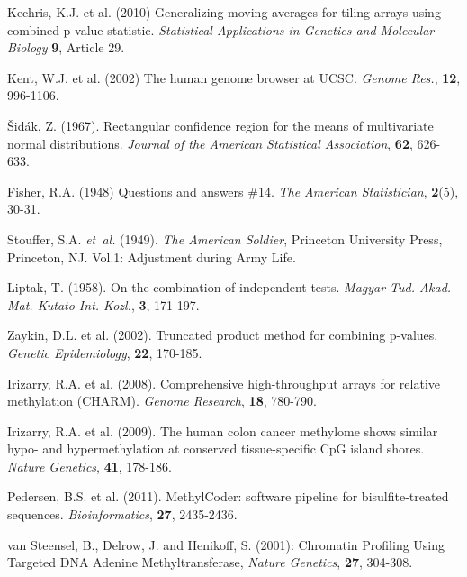 \documentclass{bioinfo}
\begin{document}
\begin{thebibliography}{}

Kechris, K.J. et al. (2010)
Generalizing moving averages for tiling arrays using combined p-value
statistic. {\it Statistical Applications in Genetics and Molecular Biology}
{\bf 9}, Article 29.

 Kent, W.J. et al. (2002) The human genome browser at UCSC. {\it
Genome Res.}, {\bf 12}, 996-1106.

\v{S}id\'{a}k, Z. (1967).
Rectangular confidence region for the means of multivariate normal distributions.
\textit{Journal of the American Statistical Association}, {\bf 62}, 626-633.

Fisher, R.A. (1948)
Questions and answers \#14.
{\it The American Statistician}, {\bf 2}(5), 30-31.

Stouffer, S.A. \textit{et~al.} (1949). \textit{The American Soldier},
Princeton University Press, Princeton, NJ. Vol.1: Adjustment during Army Life.

Liptak, T. (1958). On the combination of independent tests. {\it Magyar Tud.
Akad. Mat. Kutato Int. Kozl.}, {\bf 3}, 171-197.

 Zaykin, D.L. et al. (2002).
Truncated product method for combining p-values. {\it Genetic Epidemiology},
{\bf 22}, 170-185.

 Irizarry, R.A. et al.
(2008). Comprehensive high-throughput arrays for relative methylation (CHARM).
{\it Genome Research}, {\bf 18}, 780-790.

 Irizarry, R.A. et al.
(2009). The human colon cancer methylome shows similar hypo- and
hypermethylation at conserved tissue-specific CpG island shores.
{\it Nature Genetics}, {\bf 41}, 178-186.

 Pedersen, B.S. et al.
(2011). MethylCoder: software pipeline for bisulfite-treated sequences.
{\it Bioinformatics}, {\bf 27}, 2435-2436.

van Steensel, B., Delrow, J. and Henikoff, S. (2001):
Chromatin Profiling Using Targeted DNA Adenine Methyltransferase,
{\it Nature Genetics}, {\bf 27}, 304-308.


\end{thebibliography}
\end{document}
